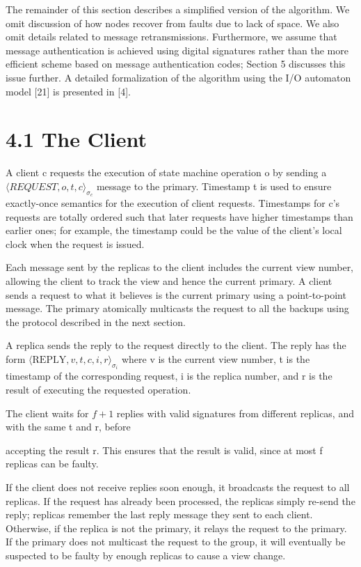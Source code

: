 \documentclass[
]{article}
\begin{document}
The remainder of this section describes a simplified version of the
algorithm. We omit discussion of how nodes recover from faults due to
lack of space. We also omit details related to message retransmissions.
Furthermore, we assume that message authentication is achieved using
digital signatures rather than the more efficient scheme based on
message authentication codes; Section 5 discusses this issue further. A
detailed formalization of the algorithm using the I/O automaton model
{[}21{]} is presented in {[}4{]}.

\section{4.1 The Client}\label{the-client}

A client c requests the execution of state machine operation o by
sending a \(\langle REQUEST, o, t, c \rangle_{\sigma_{c}}\) message to
the primary. Timestamp t is used to ensure exactly-once semantics for
the execution of client requests. Timestamps for c's requests are
totally ordered such that later requests have higher timestamps than
earlier ones; for example, the timestamp could be the value of the
client's local clock when the request is issued.

Each message sent by the replicas to the client includes the current
view number, allowing the client to track the view and hence the current
primary. A client sends a request to what it believes is the current
primary using a point-to-point message. The primary atomically
multicasts the request to all the backups using the protocol described
in the next section.

A replica sends the reply to the request directly to the client. The
reply has the form \(\langle\text{REPLY},v,t,c,i,r\rangle_{\sigma_{i}}\)
where v is the current view number, t is the timestamp of the
corresponding request, i is the replica number, and r is the result of
executing the requested operation.

The client waits for \(f + 1\) replies with valid signatures from
different replicas, and with the same t and r, before

accepting the result r. This ensures that the result is valid, since at
most f replicas can be faulty.

If the client does not receive replies soon enough, it broadcasts the
request to all replicas. If the request has already been processed, the
replicas simply re-send the reply; replicas remember the last reply
message they sent to each client. Otherwise, if the replica is not the
primary, it relays the request to the primary. If the primary does not
multicast the request to the group, it will eventually be suspected to
be faulty by enough replicas to cause a view change.
\end{document}
